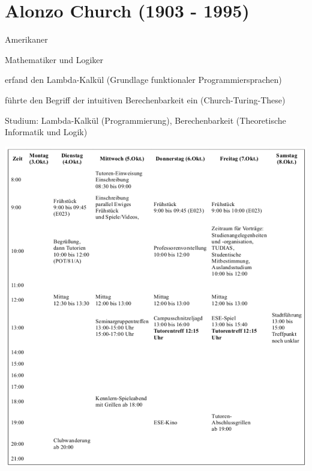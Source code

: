 \documentclass[a4paper,12pt]{report}
\begin{document}
\section*{Alonzo Church (1903 - 1995)}
\begin{itemize*}
	\item Amerikaner
	\item Mathematiker und Logiker
	\item erfand den Lambda-Kalkül (Grundlage funktionaler Programmiersprachen)
	\item führte den Begriff der intuitiven Berechenbarkeit ein (Church-Turing-These)
	\item Studium: Lambda-Kalkül (Programmierung), Berechenbarkeit (Theoretische Informatik
		  und Logik)
\end{itemize*}


\includegraphics[width=\linewidth]{./zeitplan_2016.pdf}
\end{document}
